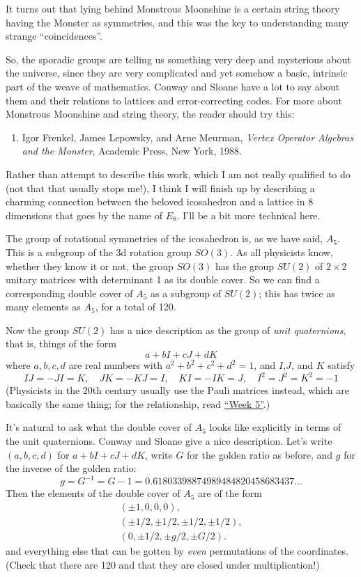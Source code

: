 \documentclass{article}
\def\tightlist{}
\begin{document}
It turns out that lying behind Monstrous Moonshine is a certain string
theory having the Monster as symmetries, and this was the key to
understanding many strange ``coincidences''.

So, the sporadic groups are telling us something very deep and
mysterious about the universe, since they are very complicated and yet
somehow a basic, intrinsic part of the weave of mathematics. Conway and
Sloane have a lot to say about them and their relations to lattices and
error-correcting codes. For more about Monstrous Moonshine and string
theory, the reader should try this:

\begin{enumerate}
\def\labelenumi{\arabic{enumi})}
\setcounter{enumi}{1}
\tightlist
\item
  Igor Frenkel, James Lepowsky, and Arne Meurman, \emph{Vertex Operator
  Algebras and the Monster}, Academic Press, New York, 1988.
\end{enumerate}

Rather than attempt to describe this work, which I am not really
qualified to do (not that that usually stops me!), I think I will finish
up by describing a charming connection between the beloved icosahedron
and a lattice in 8 dimensions that goes by the name of \(E_8\). I'll be
a bit more technical here.

The group of rotational symmetries of the icosahedron is, as we have
said, \(A_5\). This is a subgroup of the 3d rotation group \(SO(3)\). As
all physicists know, whether they know it or not, the group \(SO(3)\)
has the group \(SU(2)\) of \(2\times2\) unitary matrices with
determinant 1 as its double cover. So we can find a corresponding double
cover of \(A_5\) as a subgroup of \(SU(2)\); this has twice as many
elements as \(A_5\), for a total of 120.

Now the group \(SU(2)\) has a nice description as the group of
\emph{unit quaternions}, that is, things of the form
\[a + bI + cJ + dK\] where \(a,b,c,d\) are real numbers with
\(a^2 + b^2 + c^2 + d^2 = 1\), and \(I\),\(J\), and \(K\) satisfy
\[IJ = -JI = K, \quad JK = -KJ = I, \quad KI = -IK = J, \quad I^2 = J^2 = K^2 = -1\]
(Physicists in the 20th century usually use the Pauli matrices instead,
which are basically the same thing; for the relationship, read
\protect\hyperlink{week5}{``Week 5''}.)

It's natural to ask what the double cover of \(A_5\) looks like
explicitly in terms of the unit quaternions. Conway and Sloane give a
nice description. Let's write \((a,b,c,d)\) for \(a + bI + cJ + dK\),
write \(G\) for the golden ratio as before, and \(g\) for the inverse of
the golden ratio:
\[g = G^{-1} = G -1 = 0.61803398874989484820458683437\ldots\] Then the
elements of the double cover of \(A_5\) are of the form \[
  \begin{gathered}
    (\pm 1, 0, 0, 0),
  \\(\pm1/2, \pm1/2, \pm1/2, \pm1/2),
  \\(0, \pm1/2, \pm g/2, \pm G/2).
  \end{gathered}
\] and everything else that can be gotten by \emph{even} permutations of
the coordinates. (Check that there are 120 and that they are closed
under multiplication!)
\end{document}
